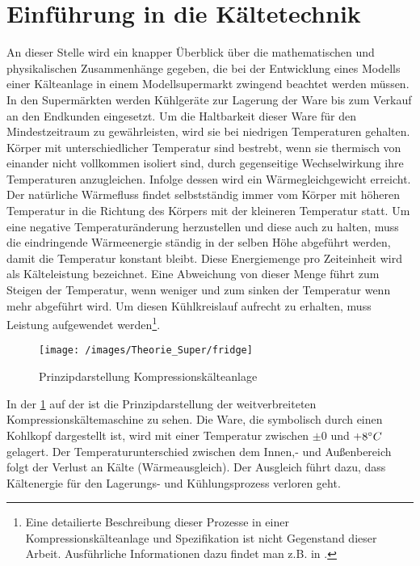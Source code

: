 
\section{Einf\"uhrung in die K\"altetechnik}

An dieser Stelle wird ein knapper \"Uberblick über die mathematischen und
physikalischen Zusammenhänge gegeben, die bei der Entwicklung eines Modells
einer K\"alteanlage in einem Modellsupermarkt zwingend beachtet werden müssen.\\

In den Superm\"arkten werden K\"uhlger\"ate zur Lagerung der Ware bis zum
Verkauf an den Endkunden eingesetzt. Um die Haltbarkeit dieser Ware f\"ur den
Mindestzeitraum zu gew\"ahrleisten, wird sie bei niedrigen Temperaturen
gehalten. Körper mit unterschiedlicher Temperatur sind bestrebt, wenn sie
thermisch von einander nicht vollkommen isoliert sind, durch gegenseitige
Wechselwirkung ihre Temperaturen anzugleichen. Infolge dessen wird ein
Wärmegleichgewicht erreicht. Der nat\"urliche W\"armefluss findet
selbstst\"andig immer vom K\"orper mit h\"oheren Temperatur in die Richtung des
K\"orpers mit der kleineren Temperatur statt. Um eine negative
Temperaturänderung herzustellen und diese auch zu halten, muss die eindringende
Wärmeenergie ständig in der selben Höhe abgeführt werden, damit die Temperatur
konstant bleibt. Diese Energiemenge pro Zeiteinheit wird als Kälteleistung
bezeichnet. Eine Abweichung von dieser Menge führt zum Steigen der Temperatur,
wenn weniger und zum sinken der Temperatur wenn mehr abgeführt wird. Um diesen
Kühlkreislauf aufrecht zu erhalten, muss Leistung aufgewendet werden\footnote{
	Eine detailierte Beschreibung dieser Prozesse in einer
	Kompressionskälteanlage und Spezifikation ist nicht Gegenstand dieser
	Arbeit.  Ausführliche Informationen dazu findet man z.B.  in \cite{caro,
	doctor, TAB_A1}.}.

\begin{figure}[h]
\begin{center}
\texttt{[image: /images/Theorie\_Super/fridge]}
\end{center}
\caption{Prinzipdarstellung Kompressionsk\"alteanlage}
\label{fig:prinz}
\end{figure}

In der \cref{fig:prinz} auf der \pageref{fig:prinz}ist die Prinzipdarstellung
der weitverbreiteten Kompressionsk\"altemaschine zu sehen. Die Ware, die
symbolisch durch einen Kohlkopf dargestellt ist, wird mit einer Temperatur
zwischen $\pm 0$ und $+8^\circ C$ gelagert. Der Temperaturunterschied zwischen
dem Innen,- und Au\ss enbereich folgt der Verlust an K\"alte (W\"armeausgleich).
Der Ausgleich f\"uhrt dazu, dass K\"altenergie f\"ur den Lagerungs- und
K\"uhlungsprozess verloren geht.

